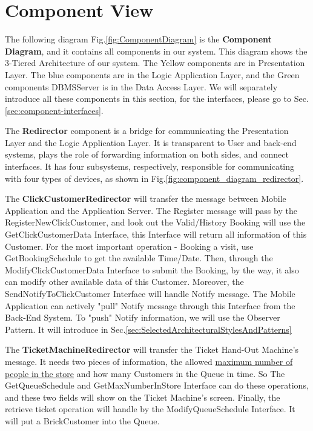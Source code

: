 \documentclass[a4paper,12pt]{report}
\begin{document}
\section{Component View} \label{sec:ComponentView}
The following diagram Fig.\ref{fig:ComponentDiagram} is the \textbf{Component Diagram}, and it contains all components in our system.
This diagram shows the 3-Tiered Architecture of our system.
The Yellow components are in Presentation Layer.
The blue components are in the Logic Application Layer, and the Green components DBMSServer is in the Data Access Layer.
We will separately introduce all these components in this section, for the interfaces, please go to Sec.\ref{sec:component-interfaces}.

The \textbf{Redirector} component is a bridge for communicating the Presentation Layer and the Logic Application Layer.
It is transparent to User and back-end systems, plays the role of forwarding information on both sides, and connect interfaces.
It has four subsystems, respectively, responsible for communicating with four types of devices, as shown in Fig.\ref{fig:component_diagram_redirector}.

The \textbf{ClickCustomerRedirector} will transfer the message between Mobile Application and the Application Server.
The Register message will pass by the RegisterNewClickCustomer, and look out the Valid/History Booking will use the GetClickCustomerData Interface,
this Interface will return all information of this Customer.
For the most important operation - Booking a visit, use GetBookingSchedule to get the available Time/Date.
Then, through the ModifyClickCustomerData Interface to submit the Booking,
by the way, it also can modify other available data of this Customer.
Moreover, the SendNotifyToClickCustomer Interface will handle Notify message.
The Mobile Application can actively "pull" Notify message through this Interface from the Back-End System.
To "push" Notify information, we will use the Observer Pattern.
It will introduce in Sec.\ref{sec:SelectedArchitecturalStylesAndPatterns}

The \textbf{TicketMachineRedirector} will transfer the Ticket Hand-Out Machine's message.
It needs two pieces of information, the allowed \hyperref[subsec:definitions]{maximum number of people in the store} and how many Customers in the Queue in time.
So The GetQueueSchedule and GetMaxNumberInStore Interface can do these operations, and these two fields will show on the Ticket Machine's screen.
Finally, the retrieve ticket operation will handle by the ModifyQueueSchedule Interface.
It will put a BrickCustomer into the Queue.
\end{document}
